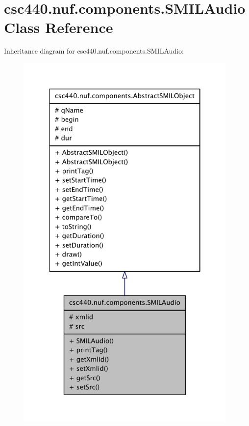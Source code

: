 \hypertarget{classcsc440_1_1nuf_1_1components_1_1_s_m_i_l_audio}{\section{csc440.\-nuf.\-components.\-S\-M\-I\-L\-Audio Class Reference}
\label{classcsc440_1_1nuf_1_1components_1_1_s_m_i_l_audio}
}


Inheritance diagram for csc440.\-nuf.\-components.\-S\-M\-I\-L\-Audio\-:
\nopagebreak
\begin{figure}[H]
\begin{center}
\leavevmode
\includegraphics[width=310pt]{classcsc440_1_1nuf_1_1components_1_1_s_m_i_l_audio__inherit__graph}
\end{center}
\end{figure}


